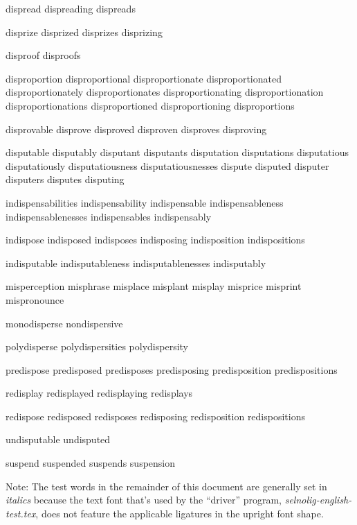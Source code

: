 \begin{itemize}
dispread dispreading dispreads

disprize disprized disprizes disprizing

disproof disproofs

disproportion disproportional disproportionate disproportionated disproportionately disproportionates disproportionating disproportionation disproportionations disproportioned disproportioning disproportions

disprovable disprove disproved disproven disproves disproving

disputable disputably disputant disputants disputation disputations disputatious disputatiously disputatiousness disputatiousnesses dispute disputed disputer disputers disputes disputing

indispensabilities indispensability indispensable indispensableness indispensablenesses indispensables indispensably

indispose indisposed indisposes indisposing indisposition indispositions

indisputable indisputableness indisputablenesses indisputably

misperception misphrase misplace misplant misplay misprice misprint mispronounce 

monodisperse nondispersive

polydisperse polydispersities polydispersity

predispose predisposed predisposes predisposing predisposition predispositions

redisplay redisplayed redisplaying redisplays

redispose redisposed redisposes redisposing redisposition redispositions

undisputable undisputed

suspend suspended suspends suspension


\end{itemize}



\bigskip

Note: The test words in the remainder of this document are generally set in \emph{italics} because the text font that's used by the ``driver'' program, \emph{selnolig-english-test.tex}, does not feature the applicable ligatures in the upright font shape.


